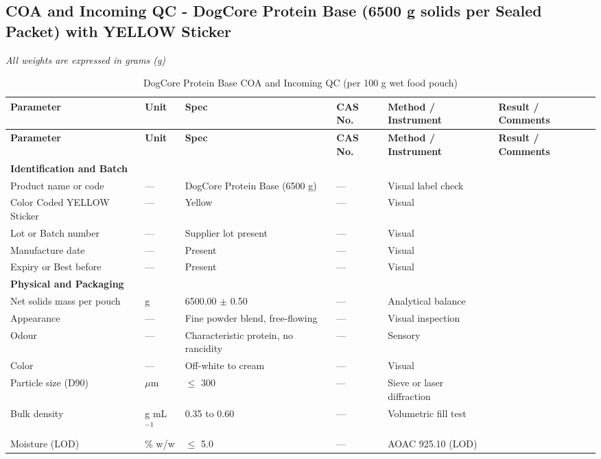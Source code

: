 
\subsection*{COA and Incoming QC - DogCore Protein Base (6500 g solids per Sealed Packet) with YELLOW Sticker}
\noindent\textit{All weights are expressed in grams (g)}
\begin{longtable}{@{}p{6.0cm}p{1.5cm}p{1.8cm}p{2.0cm}p{3.0cm}p{3.0cm}@{}}
\caption{DogCore Protein Base COA and Incoming QC (per 100 g wet food pouch)}\\
\toprule
\textbf{Parameter} & \textbf{Unit} & \textbf{Spec} & \textbf{CAS No.} & \textbf{Method / Instrument} & \textbf{Result / Comments} \\
\midrule
\endfirsthead
\toprule
\textbf{Parameter} & \textbf{Unit} & \textbf{Spec} & \textbf{CAS No.} & \textbf{Method / Instrument} & \textbf{Result / Comments} \\
\midrule
\endhead

\multicolumn{6}{l}{\textbf{Identification and Batch}} \\[3pt]
Product name or code & --- & DogCore Protein Base (6500 g) & --- & Visual label check & \\[3pt]
Color Coded YELLOW Sticker & --- & Yellow & --- & Visual & \\[3pt]
Lot or Batch number & --- & Supplier lot present & --- & Visual & \\[3pt]
Manufacture date & --- & Present & --- & Visual & \\[3pt]
Expiry or Best before & --- & Present & --- & Visual & \\[6pt]

\multicolumn{6}{l}{\textbf{Physical and Packaging}} \\[3pt]
Net solids mass per pouch & g & 6500.00 $\pm$ 0.50 & --- & Analytical balance & \\[3pt]
Appearance & --- & Fine powder blend, free-flowing & --- & Visual inspection & \\[3pt]
Odour & --- & Characteristic protein, no rancidity & --- & Sensory & \\[3pt]
Color & --- & Off-white to cream & --- & Visual & \\[3pt]
Particle size (D90) & $\mu$m & $\le$ 300 & --- & Sieve or laser diffraction & \\[3pt]
Bulk density & g mL$^{-1}$ & 0.35 to 0.60 & --- & Volumetric fill test & \\[3pt]
Moisture (LOD) & \% w/w & $\le$ 5.0 & --- & AOAC 925.10 (LOD) & \\[6pt]


\end{longtable}
